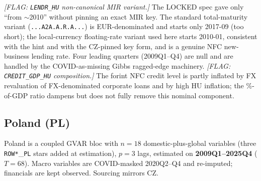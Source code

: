 \noindent\textit{[FLAG: \texttt{LENDR\_HU} non-canonical MIR variant.]}
The LOCKED spec gave only ``from $\sim$2010'' without pinning an exact MIR
key.  The standard total-maturity variant (\texttt{...\allowbreak A2A.\allowbreak A.\allowbreak R.\allowbreak A...}) is
EUR-denominated and starts only 2017-09 (too short); the local-currency
floating-rate variant used here starts 2010-01, consistent with the hint
and with the CZ-pinned key form, and is a genuine NFC new-business
lending rate.  Four leading quarters (2009Q1--Q4) are null and are
handled by the COVID-as-missing Gibbs ragged-edge machinery.
\textit{[FLAG: \texttt{CREDIT\_GDP\_HU} composition.]} The forint NFC
credit level is partly inflated by FX revaluation of FX-denominated
corporate loans and by high HU inflation; the \%-of-GDP ratio dampens but
does not fully remove this nominal component.

\subsection{Poland (PL)}\label{sec:data:PL}
Poland is a coupled GVAR bloc with $n=18$ domestic-plus-global variables
(three \texttt{ROW*}\_\texttt{PL} stars added at estimation), $p=3$ lags,
estimated on \textbf{2009Q1--2025Q4} ($T=68$).  Macro variables are
COVID-masked 2020Q2--Q4 and re-imputed; financials are kept observed.
Sourcing mirrors CZ.

